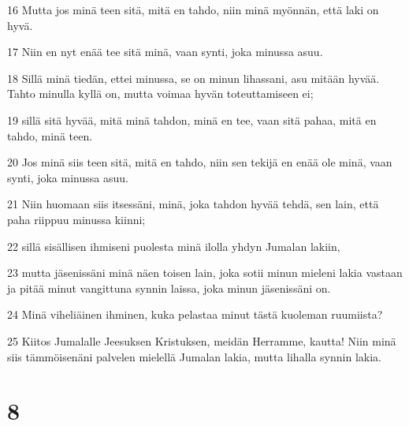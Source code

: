 \par 16 Mutta jos minä teen sitä, mitä en tahdo, niin minä myönnän, että laki on hyvä.
\par 17 Niin en nyt enää tee sitä minä, vaan synti, joka minussa asuu.
\par 18 Sillä minä tiedän, ettei minussa, se on minun lihassani, asu mitään hyvää. Tahto minulla kyllä on, mutta voimaa hyvän toteuttamiseen ei;
\par 19 sillä sitä hyvää, mitä minä tahdon, minä en tee, vaan sitä pahaa, mitä en tahdo, minä teen.
\par 20 Jos minä siis teen sitä, mitä en tahdo, niin sen tekijä en enää ole minä, vaan synti, joka minussa asuu.
\par 21 Niin huomaan siis itsessäni, minä, joka tahdon hyvää tehdä, sen lain, että paha riippuu minussa kiinni;
\par 22 sillä sisällisen ihmiseni puolesta minä ilolla yhdyn Jumalan lakiin,
\par 23 mutta jäsenissäni minä näen toisen lain, joka sotii minun mieleni lakia vastaan ja pitää minut vangittuna synnin laissa, joka minun jäsenissäni on.
\par 24 Minä viheliäinen ihminen, kuka pelastaa minut tästä kuoleman ruumiista?
\par 25 Kiitos Jumalalle Jeesuksen Kristuksen, meidän Herramme, kautta! Niin minä siis tämmöisenäni palvelen mielellä Jumalan lakia, mutta lihalla synnin lakia.

\chapter{8}

